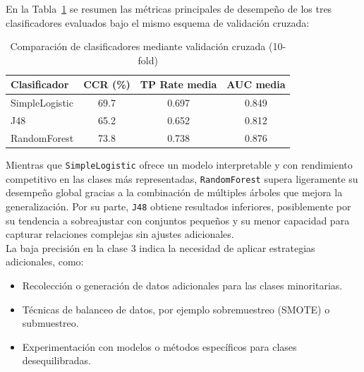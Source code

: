 \documentclass{article}
\begin{document}
En la Tabla~\ref{tab:comparacion-clasificadores} se resumen las métricas principales de desempeño de los tres clasificadores evaluados bajo el mismo esquema de validación cruzada:\\

\begin{table}[H]
    \centering
    \caption{Comparación de clasificadores mediante validación cruzada (10-fold)}
    \label{tab:comparacion-clasificadores}
    \begin{tabular}{lccc}
        \toprule
        \textbf{Clasificador} & \textbf{CCR (\%)} & \textbf{TP Rate media} & \textbf{AUC media} \\
        \midrule
        SimpleLogistic & 69.7 & 0.697 & 0.849 \\
        J48 & 65.2 & 0.652 & 0.812 \\
        RandomForest & 73.8 & 0.738 & 0.876 \\
        \bottomrule
    \end{tabular}
\end{table}

Mientras que \texttt{SimpleLogistic} ofrece un modelo interpretable y con rendimiento competitivo en las clases más representadas, \texttt{RandomForest} supera ligeramente su desempeño global gracias a la combinación de múltiples árboles que mejora la generalización. Por su parte, \texttt{J48} obtiene resultados inferiores, posiblemente por su tendencia a sobreajustar con conjuntos pequeños y su menor capacidad para capturar relaciones complejas sin ajustes adicionales.\\

La baja precisión en la clase 3 indica la necesidad de aplicar estrategias adicionales, como:

\begin{itemize}
    \item Recolección o generación de datos adicionales para las clases minoritarias.
    \item Técnicas de balanceo de datos, por ejemplo sobremuestreo (SMOTE) o submuestreo.
    \item Experimentación con modelos o métodos específicos para clases desequilibradas.
\end{itemize}
\end{document}
